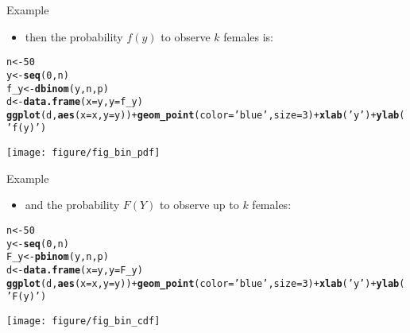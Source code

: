 \documentclass{beamer}\usepackage[]{graphicx}\usepackage[]{color}
\makeatletter
\newcommand{\hlnum}[1]{\textcolor[rgb]{0.686,0.059,0.569}{#1}}%
\newcommand{\hlstr}[1]{\textcolor[rgb]{0.192,0.494,0.8}{#1}}%
\newcommand{\hlopt}[1]{\textcolor[rgb]{0,0,0}{#1}}%
\newcommand{\hlstd}[1]{\textcolor[rgb]{0.345,0.345,0.345}{#1}}%
\newcommand{\hlkwb}[1]{\textcolor[rgb]{0.69,0.353,0.396}{#1}}%
\newcommand{\hlkwc}[1]{\textcolor[rgb]{0.333,0.667,0.333}{#1}}%
\newcommand{\hlkwd}[1]{\textcolor[rgb]{0.737,0.353,0.396}{\textbf{#1}}}%
\newenvironment{kframe}{%
 \def\at@end@of@kframe{}%
 \ifinner\ifhmode%
  \def\at@end@of@kframe{\end{minipage}}%
  \begin{minipage}{\columnwidth}%
 \fi\fi%
 \def\FrameCommand##1{\hskip\@totalleftmargin \hskip-\fboxsep
 \colorbox{shadecolor}{##1}\hskip-\fboxsep
     \hskip-\linewidth \hskip-\@totalleftmargin \hskip\columnwidth}%
 \MakeFramed {\advance\hsize-\width
   \@totalleftmargin\z@ \linewidth\hsize
   \@setminipage}}%
 {\par\unskip\endMakeFramed%
 \at@end@of@kframe}
\newenvironment{knitrout}{}{} %
\makeatother
\begin{document}
\begin{frame}[fragile]{Example}
  \begin{itemize}
    \item then the probability $f(y)$ to observe $k$ females is:
  \end{itemize}
\begin{knitrout}\tiny
{}\color{fgcolor}\begin{kframe}
\begin{alltt}
\hlstd{n} \hlkwb{<-} \hlnum{50}
\hlstd{y} \hlkwb{<-} \hlkwd{seq}\hlstd{(}\hlnum{0}\hlstd{, n)}
\hlstd{f_y} \hlkwb{<-} \hlkwd{dbinom}\hlstd{(y, n, p)}
\hlstd{d} \hlkwb{<-} \hlkwd{data.frame}\hlstd{(}\hlkwc{x}\hlstd{=y,} \hlkwc{y}\hlstd{=f_y)}
\hlkwd{ggplot}\hlstd{(d,} \hlkwd{aes}\hlstd{(}\hlkwc{x}\hlstd{=x,} \hlkwc{y}\hlstd{=y))} \hlopt{+} \hlkwd{geom_point}\hlstd{(}\hlkwc{color}\hlstd{=}\hlstr{'blue'}\hlstd{,} \hlkwc{size}\hlstd{=}\hlnum{3}\hlstd{)} \hlopt{+} \hlkwd{xlab}\hlstd{(}\hlstr{'y'}\hlstd{)} \hlopt{+} \hlkwd{ylab}\hlstd{(}\hlstr{'f(y)'}\hlstd{)}
\end{alltt}
\end{kframe}

{\centering \texttt{[image: figure/fig\_bin\_pdf]} 

}



\end{knitrout}
\end{frame}

\begin{frame}[fragile]{Example}
  \begin{itemize}
    \item and the probability $F(Y)$ to observe up to $k$ females:
  \end{itemize}
\begin{knitrout}\tiny
{}\color{fgcolor}\begin{kframe}
\begin{alltt}
\hlstd{n} \hlkwb{<-} \hlnum{50}
\hlstd{y} \hlkwb{<-} \hlkwd{seq}\hlstd{(}\hlnum{0}\hlstd{, n)}
\hlstd{F_y} \hlkwb{<-} \hlkwd{pbinom}\hlstd{(y, n, p)}
\hlstd{d} \hlkwb{<-} \hlkwd{data.frame}\hlstd{(}\hlkwc{x}\hlstd{=y,} \hlkwc{y}\hlstd{=F_y)}
\hlkwd{ggplot}\hlstd{(d,} \hlkwd{aes}\hlstd{(}\hlkwc{x}\hlstd{=x,} \hlkwc{y}\hlstd{=y))} \hlopt{+} \hlkwd{geom_point}\hlstd{(}\hlkwc{color}\hlstd{=}\hlstr{'blue'}\hlstd{,} \hlkwc{size}\hlstd{=}\hlnum{3}\hlstd{)} \hlopt{+} \hlkwd{xlab}\hlstd{(}\hlstr{'y'}\hlstd{)} \hlopt{+} \hlkwd{ylab}\hlstd{(}\hlstr{'F(y)'}\hlstd{)}
\end{alltt}
\end{kframe}

{\centering \texttt{[image: figure/fig\_bin\_cdf]} 

}



\end{knitrout}
\end{frame}
\end{document}
